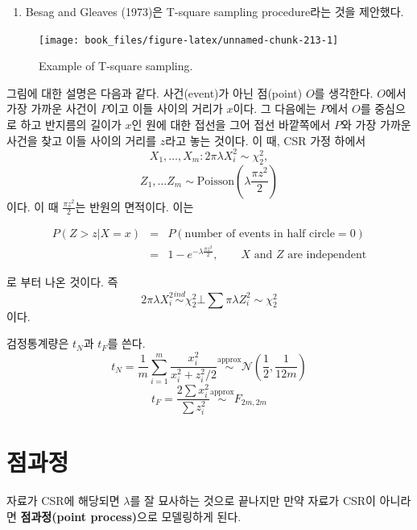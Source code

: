 \documentclass[b5paper,]{scrbook}
\providecommand{\tightlist}{%
  \setlength{\itemsep}{0pt}\setlength{\parskip}{0pt}}
\theoremstyle{plain}
\theoremstyle{definition}
\numberwithin{equation}{section}
\begin{document}
\begin{enumerate}
\def\labelenumi{\arabic{enumi}.}
\setcounter{enumi}{1}
\tightlist
\item
  Besag and Gleaves (1973)은 T-square sampling procedure라는 것을
  제안했다.
\end{enumerate}

\begin{figure}

{\centering \texttt{[image: book\_files/figure-latex/unnamed-chunk-213-1]} 

}

\caption{Example of T-square sampling.}\label{fig:unnamed-chunk-213}
\end{figure}

그림에 대한 설명은 다음과 같다. 사건(event)가 아닌 점(point) \(O\)를
생각한다. \(O\)에서 가장 가까운 사건이 \(P\)이고 이들 사이의 거리가
\(x\)이다. 그 다음에는 \(P\)에서 \(O\)를 중심으로 하고 반지름의 길이가
\(x\)인 원에 대한 접선을 그어 접선 바깥쪽에서 \(P\)와 가장 가까운 사건을
찾고 이들 사이의 거리를 \(z\)라고 놓는 것이다. 이 때, CSR 가정 하에서
\[X_{1}, \ldots, X_{m}: 2\pi\lambda X_{i}^{2} \sim \chi_{2}^{2},\]
\[Z_{1}, \ldots Z_{m} \sim \text{Poisson}(\lambda \frac{\pi z^{2}}{2})\]
이다. 이 때 \(\frac{\pi z^{2}}{2}\)는 반원의 면적이다. 이는

\begin{eqnarray*}
P(Z>z|X=x)&=& P(\text{number of events in half circle}=0)\\
&=& 1-e^{-\lambda \frac{\pi z^{2}}{2}}, \qquad{X \text{ and } Z \text{ are independent}}
\end{eqnarray*}

로 부터 나온 것이다. 즉
\[2\pi\lambda X_{i}^{2} \stackrel{ind}{\sim} \chi_{2}^{2} \bot \sum \pi\lambda Z_{i}^{2} \sim \chi_{2}^{2}\]
이다.

검정통계량은 \(t_{N}\)과 \(t_{F}\)를 쓴다.
\[t_{N}=\frac{1}{m}\sum_{i=1}^{m}\frac{x_{i}^{2}}{x_{i}^{2} + z_{i}^{2}/2} \stackrel{\text{approx}}{\sim}\mathcal{N}(\frac{1}{2}, \frac{1}{12m})\]
\[t_{F}=\frac{2\sum x_{i}^{2}}{\sum z_{i}^2} \stackrel{\text{approx}}{\sim} F_{2m,2m}\]

\chapter{점과정}\label{pointprocess}

자료가 CSR에 해당되면 \(\lambda\)를 잘 묘사하는 것으로 끝나지만 만약
자료가 CSR이 아니라면 \textbf{점과정(point process)}으로 모델링하게
된다.
\end{document}
